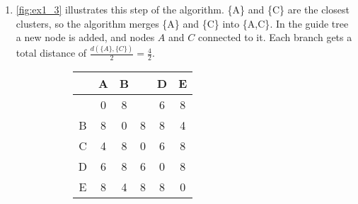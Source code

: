 \begin{example}
\begin{enumerate}
\item \cref{fig:ex1_3} illustrates this step of the algorithm.
 \textcolor{ALUblue}{\{A\}} and \textcolor{ALUblue}{\{C\}} are the closest clusters,
so the algorithm \textcolor{ALUgreen}{merges \{A\} and \{C\}  into \{A,C\}}.
In the guide tree a new node is added, and nodes $A$ and $C$ connected to it.
Each branch gets a total distance of $\frac{d(\{A\},\{C\})}{2} = \frac{4}{2}$.
\begin{figure}[H]
	\centering
	\begin{subfigure}{.4\textwidth}
    \centering
    \begin{tabular}{c|c|c|c|c|c|}
    \cline{2-6}
                                                                           & A & B & \cellcolor[HTML]{4B93C7}{\color[HTML]{EFEFEF} C} & D & E \\ \hline
    \multicolumn{1}{|c|}{\cellcolor[HTML]{4B93C7}{\color[HTML]{EFEFEF} A}} & 0 & 8 & \cellcolor[HTML]{F8A102}{\color[HTML]{000000} 4} & 6 & 8 \\ \hline
    \multicolumn{1}{|c|}{B}                                                & 8 & 0 & 8                                                & 8 & 4 \\ \hline
    \multicolumn{1}{|c|}{C}                                                & 4 & 8 & 0                                                & 6 & 8 \\ \hline
    \multicolumn{1}{|c|}{D}                                                & 6 & 8 & 6                                                & 0 & 8 \\ \hline
    \multicolumn{1}{|c|}{E}                                                & 8 & 4 & 8                                                & 8 & 0 \\ \hline
    \end{tabular}
	\end{subfigure}
	\begin{subfigure}{.4\textwidth}
    \centering
\end{subfigure}
\end{figure}
\end{enumerate}
\end{example}
